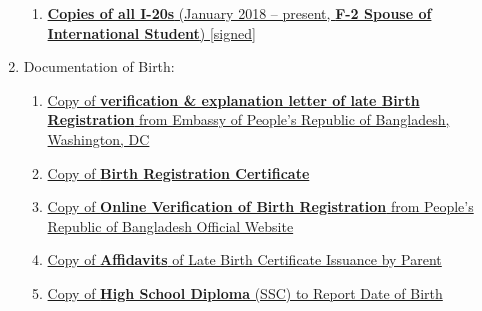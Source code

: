 \begin{enumerate}[label=\textbf{ Exhibit-\arabic*},start=15]
\begin{enumerate}[label=\roman*.]
        
    \item \hyperref[exhibit6e]{\textbf{Copies of all I-20s} (January 2018 – present, \textbf{F-2 Spouse of International Student}) [signed]}
    
    \end{enumerate}

    \item Documentation of Birth:
    \begin{enumerate}[label=\roman*.]
        \item \hyperref[exhibit5a]{Copy of \textbf{verification \& explanation letter of late Birth Registration} from Embassy of People's Republic of Bangladesh, Washington, DC}
        \item \hyperref[exhibit5b]{Copy of \textbf{Birth Registration Certificate}}
        \item \hyperref[exhibit5c]{Copy of \textbf{Online Verification of Birth Registration} from People's Republic of Bangladesh Official Website}
        \item \hyperref[exhibit5d]{Copy of \textbf{Affidavits} of Late Birth Certificate Issuance by Parent}
        \item \hyperref[exhibit5e]{Copy of \textbf{High School Diploma} (SSC) to Report Date of Birth}
    \end{enumerate}
    

\end{enumerate}
